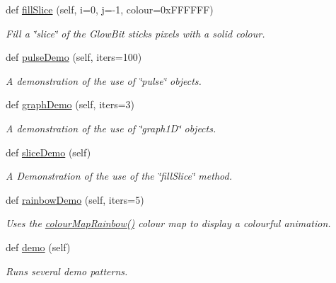 \begin{DoxyCompactItemize}
def \hyperlink{classglowbit_1_1stick_a232b27f2f0e1c27787e6a584a05fc34c}{fill\+Slice} (self, i=0, j=-\/1, colour=0x\+F\+F\+F\+F\+F\+F)
\begin{DoxyCompactList}\small\item\em Fill a \char`\"{}slice\char`\"{} of the Glow\+Bit stick\textquotesingle{}s pixels with a solid colour. \end{DoxyCompactList}\item 
def \hyperlink{classglowbit_1_1stick_a1ea899a8e5ed6f4c24662853cb9a767d}{pulse\+Demo} (self, iters=100)
\begin{DoxyCompactList}\small\item\em A demonstration of the use of \char`\"{}pulse\char`\"{} objects. \end{DoxyCompactList}\item 
def \hyperlink{classglowbit_1_1stick_a7f45fb8bf324841b710a215b1b2e3a1c}{graph\+Demo} (self, iters=3)
\begin{DoxyCompactList}\small\item\em A demonstration of the use of \char`\"{}graph1\+D\char`\"{} objects. \end{DoxyCompactList}\item 
def \hyperlink{classglowbit_1_1stick_a26eedb25d40d67d1e2ca786a7b8eb8b0}{slice\+Demo} (self)
\begin{DoxyCompactList}\small\item\em A Demonstration of the use of the \char`\"{}fill\+Slice\char`\"{} method. \end{DoxyCompactList}\item 
\mbox{\label{classglowbit_1_1stick_ad23524e5e4795fe9685dc51cfa0a3512}} 
def \hyperlink{classglowbit_1_1stick_ad23524e5e4795fe9685dc51cfa0a3512}{rainbow\+Demo} (self, iters=5)
\begin{DoxyCompactList}\small\item\em Uses the \hyperlink{classglowbit_1_1colourMaps_a41e8852322605003cf7f9f75ff508a8e}{colour\+Map\+Rainbow()} colour map to display a colourful animation. \end{DoxyCompactList}\item 
\mbox{\label{classglowbit_1_1stick_a6630193c4696faead410a15c7e98e9c8}} 
def \hyperlink{classglowbit_1_1stick_a6630193c4696faead410a15c7e98e9c8}{demo} (self)
\begin{DoxyCompactList}\small\item\em Runs several demo patterns. \end{DoxyCompactList}\end{DoxyCompactItemize}
